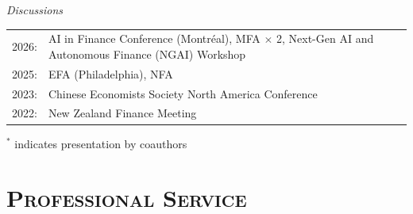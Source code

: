 \documentclass[11pt]{article}
\renewenvironment{itemize}{
  \begin{list}{}{
    \setlength{\leftmargin}{1.5em}
  }
}{
  \end{list}
}
\begin{document}
\begin{itemize}
\item{\textit{Discussions}}
\begin{tabularx}{\linewidth}{@{}l@{\quad}X@{}}
\\[-0.8em]
2026: & AI in Finance Conference (Montréal), MFA $\times$ 2, Next-Gen AI and Autonomous Finance (NGAI) Workshop \\
2025: & EFA (Philadelphia), NFA \\
2023: & Chinese Economists Society North America Conference \\
2022: & New Zealand Finance Meeting \\
\end{tabularx}

\item{$^*$ indicates presentation by coauthors}

\end{itemize}




\section*{\textsc{Professional Service}}
\end{document}
